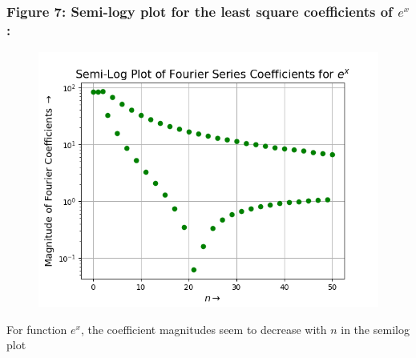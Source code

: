 \documentclass[12pt, a4paper]{article}
\begin{document}
\subsubsection{Figure 7: Semi-logy plot for the least square coefficients of $e^{x}$:}
\vspace*{-0.5cm}
\begin{figure}[H]
        \centering
        \includegraphics[scale = 0.75]{Figure_7.png}
        \label{fig:sample}
    \end{figure}
\vspace*{-0.5cm}
    \begin{center}
        For function $e^{x}$, the coefficient magnitudes seem to decrease with $n$ in the semilog plot
    \end{center}
\end{document}

